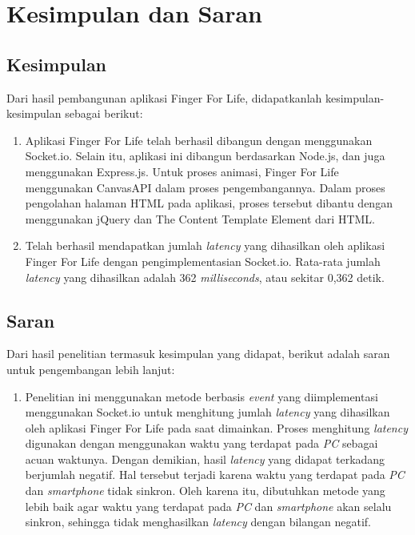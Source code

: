 \chapter{Kesimpulan dan Saran}
\label{chap:kesdansaran}

\section{Kesimpulan}
\label{sec:kesimpulan}
Dari hasil pembangunan aplikasi Finger For Life, didapatkanlah kesimpulan-kesimpulan sebagai berikut:

\begin{enumerate}
	\item Aplikasi Finger For Life telah berhasil dibangun dengan menggunakan Socket.io. Selain itu, aplikasi ini dibangun berdasarkan Node.js, dan juga menggunakan Express.js. Untuk proses animasi, Finger For Life menggunakan CanvasAPI dalam proses pengembangannya. Dalam proses pengolahan halaman HTML pada aplikasi, proses tersebut dibantu dengan menggunakan jQuery dan The Content Template Element dari HTML.
	
	\item Telah berhasil mendapatkan jumlah \textit{latency} yang dihasilkan oleh aplikasi Finger For Life dengan pengimplementasian Socket.io. Rata-rata jumlah \textit{latency} yang dihasilkan adalah 362 \textit{milliseconds}, atau sekitar 0,362 detik.
\end{enumerate}

\section{Saran}
\label{sec:saran}

Dari hasil penelitian termasuk kesimpulan yang didapat, berikut adalah saran untuk pengembangan lebih lanjut:

\begin{enumerate}
	\item Penelitian ini menggunakan metode berbasis \textit{event} yang diimplementasi menggunakan Socket.io untuk menghitung jumlah \textit{latency} yang dihasilkan oleh aplikasi Finger For Life pada saat dimainkan. Proses menghitung \textit{latency} digunakan dengan menggunakan waktu yang terdapat pada \textit{PC} sebagai acuan waktunya. Dengan demikian, hasil \textit{latency} yang didapat terkadang berjumlah negatif. Hal tersebut terjadi karena waktu yang terdapat pada \textit{PC} dan \textit{smartphone} tidak sinkron. Oleh karena itu, dibutuhkan metode yang lebih baik agar waktu yang terdapat pada \textit{PC} dan \textit{smartphone} akan selalu sinkron, sehingga tidak menghasilkan \textit{latency} dengan bilangan negatif.
\end{enumerate}